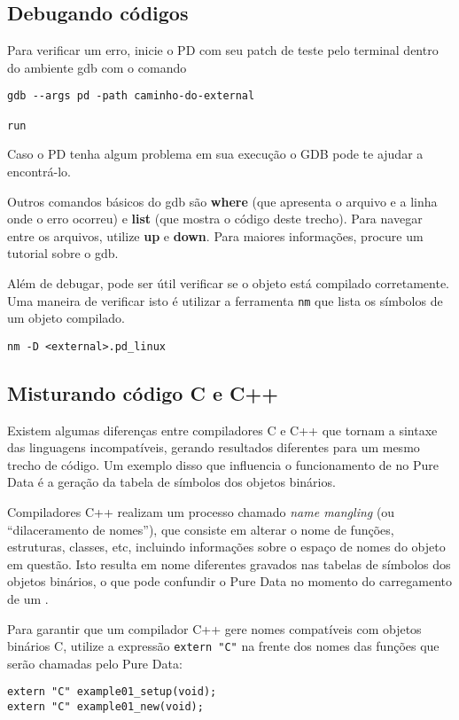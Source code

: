 \subsection{Debugando códigos}

Para verificar um erro, inicie o PD com seu patch de teste pelo terminal dentro do 
ambiente gdb com o comando

\begin{lstlisting}
gdb --args pd -path caminho-do-external

run
\end{lstlisting}
Caso o PD tenha algum problema em sua execução o GDB pode te ajudar a encontrá-lo.

Outros comandos básicos do gdb são \textbf{where} (que apresenta o arquivo e a linha onde
o erro ocorreu) e \textbf{list} (que mostra o código deste trecho).
Para navegar entre os arquivos, utilize \textbf{up} e \textbf{down}.
Para maiores informações, procure um tutorial sobre o gdb.

Além de debugar, pode ser útil verificar se o objeto está compilado corretamente.
Uma maneira de verificar isto é utilizar a ferramenta \texttt{nm} que lista os
símbolos de um objeto compilado.

\begin{lstlisting}
nm -D <external>.pd_linux
\end{lstlisting}

\subsection{Misturando código C e C++}

Existem algumas diferenças entre compiladores C e C++ que tornam a sintaxe das
linguagens incompatíveis, gerando resultados diferentes para um mesmo trecho
de código. Um exemplo disso que influencia o funcionamento de \externals no
Pure Data é a geração da tabela de símbolos dos objetos binários.

Compiladores C++ realizam um processo chamado \emph{name mangling} (ou
``dilaceramento de nomes''), que consiste em alterar o nome de funções,
estruturas, classes, etc, incluindo informações sobre o espaço de nomes do
objeto em questão. Isto resulta em nome diferentes gravados nas tabelas de
símbolos dos objetos binários, o que pode confundir o Pure Data no momento do
carregamento de um \external.

Para garantir que um compilador C++ gere nomes compatíveis com objetos
binários C, utilize a expressão \texttt{extern "C"} na frente dos nomes das
funções que serão chamadas pelo Pure Data:

\begin{lstlisting}[caption=Externalização de código C++]
extern "C" example01_setup(void);
extern "C" example01_new(void);
\end{lstlisting}



